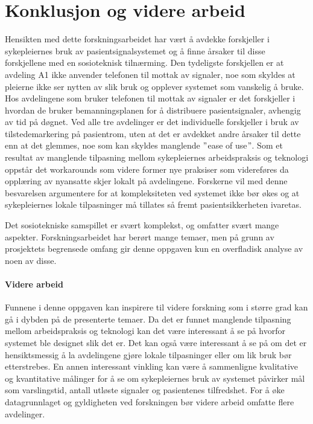 \chapter{Konklusjon og videre arbeid}
\label{chp:konklusjon} 
Hensikten med dette forskningsarbeidet har vært å avdekke forskjeller i sykepleiernes bruk av pasientsignalsystemet og å finne årsaker til disse forskjellene med en sosioteknisk tilnærming. Den tydeligste forskjellen er at avdeling A1 ikke anvender telefonen til mottak av signaler, noe som skyldes at pleierne ikke ser nytten av slik bruk og opplever systemet som vanskelig å bruke. Hos avdelingene som bruker telefonen til mottak av signaler er det forskjeller i hvordan de bruker bemanningsplanen for å distribuere pasientsignaler, avhengig av tid på døgnet. Ved alle tre avdelinger er det individuelle forskjeller i bruk av tilstedemarkering på pasientrom, uten at det er avdekket andre årsaker til dette enn at det glemmes, noe som kan skyldes manglende $"$ease of use$"$. Som et resultat av manglende tilpasning mellom sykepleiernes arbeidspraksis og teknologi oppstår det workarounds som videre former nye praksiser som videreføres da opplæring av nyansatte skjer lokalt på avdelingene. Forskerne vil med denne besvarelsen argumentere for at kompleksiteten ved systemet ikke bør økes og at sykepleiernes lokale tilpasninger må tillates så fremt pasientsikkerheten ivaretas.

\noindent
Det sosiotekniske samspillet er svært komplekst, og omfatter svært mange aspekter. Forskningsarbeidet har berørt mange temaer, men på grunn av prosjektets begrensede omfang gir denne oppgaven kun en overfladisk analyse av noen av disse. 

\subsubsection{Videre arbeid}
Funnene i denne oppgaven kan inspirere til videre forskning som i større grad kan gå i dybden på de presenterte temaer. Da det er funnet manglende tilpasning mellom arbeidspraksis og teknologi kan det være interessant å se på hvorfor systemet ble designet slik det er. Det kan også være interessant å se på om det er hensiktsmessig å la avdelingene gjøre lokale tilpasninger eller om lik bruk bør etterstrebes. En annen interessant vinkling kan være å sammenligne kvalitative og kvantitative målinger for å se om sykepleiernes bruk av systemet påvirker mål som varslingstid, antall utløste signaler og pasientenes tilfredshet. For å øke datagrunnlaget og gyldigheten ved forskningen bør videre arbeid omfatte flere avdelinger. 
